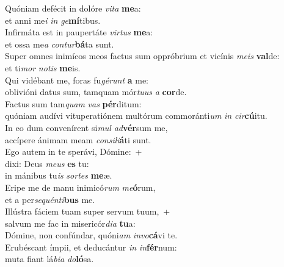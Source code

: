 \evenverse Quóniam defécit in dolóre \textit{vi}\textit{ta} \textbf{me}a:~\*\\
\evenverse et anni me\textit{i} \textit{in} \textit{ge}\textbf{mí}tibus.\\
\oddverse Infirmáta est in paupertáte \textit{vir}\textit{tus} \textbf{me}a:~\*\\
\oddverse et ossa me\textit{a} \textit{con}\textit{tur}\textbf{bá}ta sunt.\\
\evenverse Super omnes inimícos meos factus sum oppróbrium et vicínis \textit{me}\textit{is} \textbf{val}de:~\*\\
\evenverse et ti\textit{mor} \textit{no}\textit{tis} \textbf{me}is.\\
\oddverse Qui vidébant me, foras fu\textit{gé}\textit{runt} \textbf{a} me:~\*\\
\oddverse oblivióni datus sum, tamquam mór\textit{tu}\textit{us} \textit{a} \textbf{cor}de.\\
\evenverse Factus sum tam\textit{quam} \textit{vas} \textbf{pér}ditum:~\*\\
\evenverse quóniam audívi vituperatiónem multórum commoránti\textit{um} \textit{in} \textit{cir}\textbf{cú}itu.\\
\oddverse In eo dum convenírent si\textit{mul} \textit{ad}\textbf{vér}sum me,~\*\\
\oddverse accípere ánimam meam \textit{con}\textit{si}\textit{li}\textbf{á}ti sunt.\\
\evenverse Ego autem in te sperávi, Dómine:~+\\
\evenverse  dixi: Deus \textit{me}\textit{us} \textbf{es} tu:~\*\\
\evenverse in mánibus tu\textit{is} \textit{sor}\textit{tes} \textbf{me}æ.\\
\oddverse Eripe me de manu inimicó\textit{rum} \textit{me}\textbf{ó}rum,~\*\\
\oddverse et a per\textit{se}\textit{quén}\textit{ti}\textbf{bus} me.\\
\evenverse Illústra fáciem tuam super servum tuum,~+\\
\evenverse  salvum me fac in misericór\textit{di}\textit{a} \textbf{tu}a:~\*\\
\evenverse Dómine, non confúndar, quóni\textit{am} \textit{in}\textit{vo}\textbf{cá}vi te.\\
\oddverse Erubéscant ímpii, et deducántur \textit{in} \textit{in}\textbf{fér}num:~\*\\
\oddverse muta fiant lá\textit{bi}\textit{a} \textit{do}\textbf{ló}sa.\\
